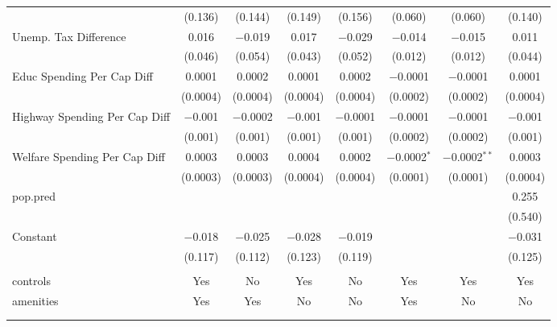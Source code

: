 \begin{table}[!htbp]
\begin{tabular}{@{\extracolsep{5pt}}lccccccc}
  & (0.136) & (0.144) & (0.149) & (0.156) & (0.060) & (0.060) & (0.140) \\ 
  Unemp. Tax Difference & 0.016 & $-$0.019 & 0.017 & $-$0.029 & $-$0.014 & $-$0.015 & 0.011 \\ 
  & (0.046) & (0.054) & (0.043) & (0.052) & (0.012) & (0.012) & (0.044) \\ 
  Educ Spending Per Cap Diff & 0.0001 & 0.0002 & 0.0001 & 0.0002 & $-$0.0001 & $-$0.0001 & 0.0001 \\ 
  & (0.0004) & (0.0004) & (0.0004) & (0.0004) & (0.0002) & (0.0002) & (0.0004) \\ 
  Highway Spending Per Cap Diff & $-$0.001 & $-$0.0002 & $-$0.001 & $-$0.0001 & $-$0.0001 & $-$0.0001 & $-$0.001 \\ 
  & (0.001) & (0.001) & (0.001) & (0.001) & (0.0002) & (0.0002) & (0.001) \\ 
  Welfare Spending Per Cap Diff & 0.0003 & 0.0003 & 0.0004 & 0.0002 & $-$0.0002$^{*}$ & $-$0.0002$^{**}$ & 0.0003 \\ 
  & (0.0003) & (0.0003) & (0.0004) & (0.0004) & (0.0001) & (0.0001) & (0.0004) \\ 
  pop.pred &  &  &  &  &  &  & 0.255 \\ 
  &  &  &  &  &  &  & (0.540) \\ 
  Constant & $-$0.018 & $-$0.025 & $-$0.028 & $-$0.019 &  &  & $-$0.031 \\ 
  & (0.117) & (0.112) & (0.123) & (0.119) &  &  & (0.125) \\ 
 \hline \\[-1.8ex] 
controls & Yes & No & Yes & No & Yes & Yes & Yes \\ 
amenities & Yes & Yes & No & No & Yes & No & No \\ 
\hline \\[-1.8ex] 
\hline 
\hline \\[-1.8ex] 
\end{tabular} 
\end{table} 
